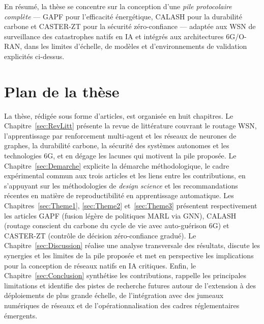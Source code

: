 En résumé, la thèse se concentre sur la conception d'une \emph{pile protocolaire complète} — GAPF pour l'efficacité énergétique, CALASH pour la durabilité carbone et CASTER-ZT pour la sécurité zéro-confiance — adaptée aux WSN de surveillance des catastrophes natifs en IA et intégrés aux architectures 6G/O-RAN, dans les limites d'échelle, de modèles et d'environnements de validation explicités ci-dessus.

\section{Plan de la thèse}\label{sec:Plan}

La thèse, rédigée sous forme d'articles, est organisée en huit chapitres. Le Chapitre~\ref{sec:RevLitt} présente la revue de littérature couvrant le routage WSN, l'apprentissage par renforcement multi-agent et les réseaux de neurones de graphes, la durabilité carbone, la sécurité des systèmes autonomes et les technologies 6G, et en dégage les lacunes qui motivent la pile proposée\cite{chong2003sensor,freitag2021ict,saad2020vision6g,polese2023oran,metaheuristic_wsn_slr2026}. Le Chapitre~\ref{sec:Demarche} explicite la démarche méthodologique, le cadre expérimental commun aux trois articles et les liens entre les contributions, en s'appuyant sur les méthodologies de \emph{design science} et les recommandations récentes en matière de reproductibilité en apprentissage automatique\cite{Hevner2004DesignScience,Peffers2007DSRM,Pineau2021Reproducibility}. Les Chapitres~\ref{sec:Theme1}, \ref{sec:Theme2} et~\ref{sec:Theme3} présentent respectivement les articles GAPF (fusion légère de politiques MARL via GNN), CALASH (routage conscient du carbone du cycle de vie avec auto-guérison 6G) et CASTER-ZT (contrôle de décision zéro-confiance gradué)\cite{liu2024gnncomm,pirson2021embodied,pranger2025shields,Nguyen2025GNNIoT}. Le Chapitre~\ref{sec:Discussion} réalise une analyse transversale des résultats, discute les synergies et les limites de la pile proposée et met en perspective les implications pour la conception de réseaux natifs en IA critiques. Enfin, le Chapitre~\ref{sec:Conclusion} synthétise les contributions, rappelle les principales limitations et identifie des pistes de recherche futures autour de l'extension à des déploiements de plus grande échelle, de l'intégration avec des jumeaux numériques de réseaux et de l'opérationnalisation des cadres réglementaires émergents\cite{Nguyen2024DTORAN,demirel2026agentic,euaiact2024,itu_ict2025}.